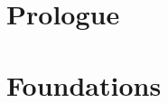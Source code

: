 \documentclass[a4paper,11pt]{memoir}
\newcommand{\note}[1]{\emph{#1}}
\theoremstyle{plain} \newtheorem{id}{Lemma}[chapter]
\theoremstyle{definition} \newtheorem{pr}{Problem}[chapter]
\theoremstyle{remark}\newtheorem{ab}{Remark}[chapter]
\begin{document}
\mainmatter
  \renewcommand{\partnote}{
  This page is intentionally left blank.
  }
  \part{Prologue}
    
    
  \renewcommand{\doublenote}{%
  \note{It takes until January $13^{th}, 2018$ to reach this part.}}
  \part{Foundations}
    
    
\end{document}
